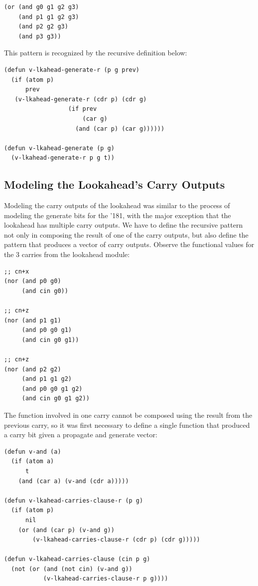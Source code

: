 \documentclass[fleqn,10pt]{SelfArx} %
\begin{document}
\begin{lstlisting}
(or (and g0 g1 g2 g3)
    (and p1 g1 g2 g3)
    (and p2 g2 g3)
    (and p3 g3))
\end{lstlisting}

This pattern is recognized by the recursive definition below:

\begin{lstlisting}
(defun v-lkahead-generate-r (p g prev)
  (if (atom p)
      prev 
   (v-lkahead-generate-r (cdr p) (cdr g)
                  (if prev
                      (car g)
                    (and (car p) (car g))))))

(defun v-lkahead-generate (p g)
  (v-lkahead-generate-r p g t)) 
\end{lstlisting}


\subsection{Modeling the Lookahead's Carry Outputs}
Modeling the carry outputs of the lookahead was similar to the process of modeling the generate bits for the '181, with the major exception that the lookahead has multiple carry outputs. We have to define the recursive pattern not only in composing the result of one of the carry outputs, but also define the pattern that produces a vector of carry outputs. Observe the functional values for the 3 carries from the lookahead module:

\begin{lstlisting}
;; cn+x 
(nor (and p0 g0)
     (and cin g0))

;; cn+z
(nor (and p1 g1)
     (and p0 g0 g1)
     (and cin g0 g1))

;; cn+z
(nor (and p2 g2)
     (and p1 g1 g2)
     (and p0 g0 g1 g2)
     (and cin g0 g1 g2))
\end{lstlisting}

The function involved in one carry cannot be composed using the result from the previous carry, so it was first necessary to define a single function that produced a carry bit given a propagate and generate vector:

\begin{lstlisting}
(defun v-and (a)
  (if (atom a)
      t
    (and (car a) (v-and (cdr a)))))

(defun v-lkahead-carries-clause-r (p g)
  (if (atom p)
      nil
    (or (and (car p) (v-and g))
        (v-lkahead-carries-clause-r (cdr p) (cdr g)))))

(defun v-lkahead-carries-clause (cin p g)
  (not (or (and (not cin) (v-and g))
           (v-lkahead-carries-clause-r p g)))) 
\end{lstlisting}
\end{document}
